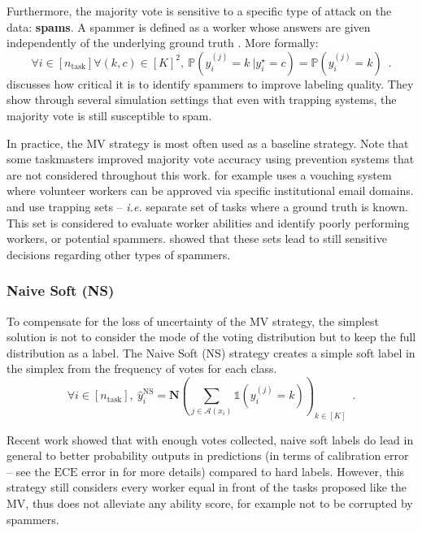 Furthermore, the majority vote is sensitive to a specific type of attack on the data: \textbf{spams}.
A spammer is defined as a worker whose answers are given independently of the underlying ground truth \citep{raykar_ranking_2011}. More formally:
\begin{equation}\label{eq:spammer}
    \forall i \in [n_\text{task}] \forall (k,c) \in [K]^2,\ \mathbb{P}(y_i^{(j)} = k\ | y_i^\star=c) = \mathbb{P}(y_i^{(j)} = k) \enspace.
\end{equation}
\citet{vuurens2011much} discusses how critical it is to identify spammers to improve labeling quality. They show through several simulation settings that even with trapping systems, the majority vote is still susceptible to spam.

In practice, the MV strategy is most often used as a baseline strategy.
Note that some taskmasters improved majority vote accuracy using prevention systems that are not considered throughout this work.
\citet{hoang2021tournesol} for example uses a vouching system where volunteer workers can be approved via specific institutional email domains.
\citet{khattak_toward_2017} and \citet{peterson_human_2019} use trapping sets -- \emph{i.e.} separate set of tasks where a ground truth is known. This set is considered to evaluate worker abilities and identify poorly performing workers, or potential spammers. \citet{vuurens2011much} showed that these sets lead to still sensitive decisions regarding other types of spammers.

\subsubsection{Naive Soft (NS)}
\label{subsub:ns}

To compensate for the loss of uncertainty of the MV strategy, the simplest solution is not to consider the mode of the voting distribution but to keep the full distribution as a label.
The Naive Soft (NS) strategy creates a simple soft label in the simplex from the frequency of votes for each class.
\begin{equation}\label{eq:ns}
    \forall i\in [n_\text{task}],\ \hat y_i^{\mathrm{NS}} = \mathbf{N}\left(\sum_{j\in\mathcal{A}(x_i)} \mathds{1}(y_i^{(j)}=k)\right)_{k\in[K]} \enspace.
\end{equation}

Recent work \citep{collins2022eliciting} showed that with enough votes collected, naive soft labels do lead in general to better probability outputs in predictions (in terms of calibration error -- see the $\mathrm{ECE}$ error in  for more details) compared to hard labels.
However, this strategy still considers every worker equal in front of the tasks proposed like the MV, thus does not alleviate any ability score, for example not to be corrupted by spammers.

